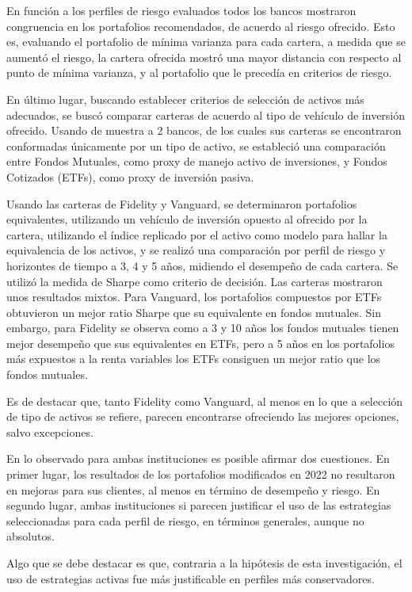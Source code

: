 \documentclass[a4paper,fleqn]{cas-sc}
\begin{document}
En función a los perfiles de riesgo evaluados todos los bancos mostraron congruencia en los portafolios recomendados, de acuerdo al riesgo ofrecido. Esto es, evaluando el portafolio de mínima varianza para cada cartera, a medida que se aumentó el riesgo, la cartera ofrecida mostró una mayor distancia con respecto al punto de mínima varianza, y al portafolio que le precedía en criterios de riesgo. 

En último lugar, buscando establecer criterios de selección de activos más adecuados, se buscó comparar carteras de acuerdo al tipo de vehículo de inversión ofrecido. Usando de muestra a 2 bancos, de los cuales sus carteras se encontraron conformadas únicamente por un tipo de activo, se estableció una comparación entre Fondos Mutuales, como proxy de manejo activo de inversiones, y Fondos Cotizados (ETFs), como proxy de inversión pasiva. 

Usando las carteras de Fidelity y Vanguard, se determinaron portafolios equivalentes, utilizando un vehículo de inversión opuesto al ofrecido por la cartera, utilizando el índice replicado por el activo como modelo para hallar la equivalencia de los activos, y se realizó una comparación por perfil de riesgo y horizontes de tiempo a 3, 4 y 5 años, midiendo el desempeño de cada cartera. Se utilizó la medida de Sharpe como criterio de decisión.  Las carteras mostraron unos resultados mixtos. Para Vanguard, los portafolios compuestos por ETFs obtuvieron un mejor ratio Sharpe que su equivalente en fondos mutuales. Sin embargo, para Fidelity se observa como a 3 y 10 años los fondos mutuales tienen mejor desempeño que sus equivalentes en ETFs, pero a 5 años en los portafolios más expuestos a la renta variables los ETFs consiguen un mejor ratio que los fondos mutuales.

Es de destacar que, tanto Fidelity como Vanguard, al menos en lo que a selección de tipo de activos se refiere, parecen encontrarse ofreciendo las mejores opciones, salvo excepciones. 

En lo observado para ambas instituciones es posible afirmar dos cuestiones. En primer lugar, los resultados de los portafolios modificados en 2022 no resultaron en mejoras para sus clientes, al menos en término de desempeño y riesgo. En segundo lugar, ambas instituciones si parecen justificar el uso de las estrategias seleccionadas para cada perfil de riesgo, en términos generales, aunque no absolutos. 

Algo que se debe destacar es que, contraria a la hipótesis de esta investigación, el uso de estrategias activas fue más justificable en perfiles más conservadores.
\end{document}
